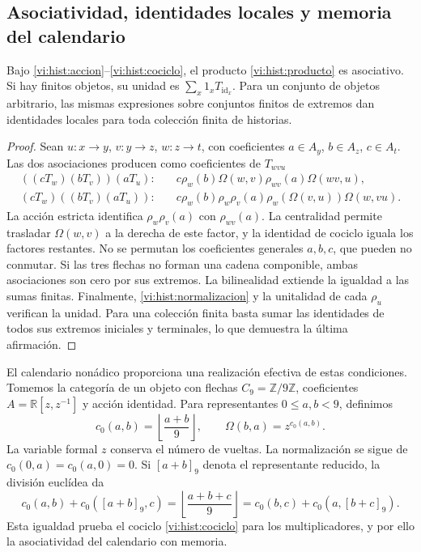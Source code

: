 \subsection{Asociatividad, identidades locales y memoria del calendario}
\label{vi:hist:asociatividad}

\begin{proposition}
Bajo \eqref{vi:hist:accion}--\eqref{vi:hist:cociclo}, el producto
\eqref{vi:hist:producto} es asociativo. Si hay finitos objetos, su unidad
es \(\sum_x1_xT_{\operatorname{id}_x}\). Para un conjunto de objetos
arbitrario, las mismas expresiones sobre conjuntos finitos de extremos
dan identidades locales para toda colección finita de historias.
\end{proposition}
\begin{proof}
Sean \(u:x\to y\), \(v:y\to z\), \(w:z\to t\), con coeficientes
\(a\in A_y\), \(b\in A_z\), \(c\in A_t\). Las dos asociaciones
producen como coeficientes de \(T_{wvu}\)
\begin{align*}
 ((cT_w)(bT_v))(aT_u):\quad&
 c\rho_w(b)\Omega(w,v)\rho_{wv}(a)\Omega(wv,u),\\
 (cT_w)((bT_v)(aT_u)):\quad&
 c\rho_w(b)\rho_w\rho_v(a)
 \rho_w(\Omega(v,u))\Omega(w,vu).
\end{align*}
La acción estricta identifica \(\rho_w\rho_v(a)\) con
\(\rho_{wv}(a)\). La centralidad permite trasladar
\(\Omega(w,v)\) a la derecha de este factor, y la identidad de cociclo
iguala los factores restantes. No se permutan los coeficientes generales
\(a,b,c\), que pueden no conmutar. Si las tres flechas no forman una
cadena componible, ambas asociaciones son cero por sus extremos.
La bilinealidad extiende la igualdad a las sumas finitas. Finalmente,
\eqref{vi:hist:normalizacion} y la unitalidad de cada \(\rho_u\)
verifican la unidad. Para una colección finita basta sumar las identidades
de todos sus extremos iniciales y terminales, lo que demuestra la última
afirmación.
\end{proof}

El calendario nonádico proporciona una realización efectiva de estas
condiciones. Tomemos la categoría de un objeto con flechas
\(C_9=\mathbb Z/9\mathbb Z\), coeficientes
\(A=\mathbb R[z,z^{-1}]\) y acción identidad. Para representantes
\(0\le a,b<9\), definimos
\begin{equation}
 c_0(a,b)=\left\lfloor\frac{a+b}{9}\right\rfloor,
 \qquad\Omega(b,a)=z^{c_0(a,b)}.
 \label{vi:hist:carry-calendario}
\end{equation}
La variable formal \(z\) conserva el número de vueltas. La normalización
se sigue de \(c_0(0,a)=c_0(a,0)=0\). Si \([a+b]_9\) denota el
representante reducido, la división euclídea da
\[
 c_0(a,b)+c_0([a+b]_9,c)
 =\left\lfloor\frac{a+b+c}{9}\right\rfloor
 =c_0(b,c)+c_0(a,[b+c]_9).
\]
Esta igualdad prueba el cociclo \eqref{vi:hist:cociclo} para los
multiplicadores, y por ello la asociatividad del calendario con memoria.

